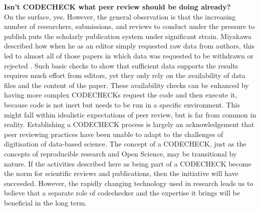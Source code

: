 \documentclass[12pt]{article}
\begin{document}
\textbf{Isn't CODECHECK what peer review should be doing already?} \\
On the surface, yes.
However, the general observation is that the
increasing number of researchers, submissions, and reviews to conduct
under the pressure to publish puts the scholarly publication system
under significant strain.
Miyakawa described how when he as an editor simply requested raw data from authors, this led to almost all of those papers in which data was requested to be withdrawn or rejected \cite{miyakawa_no_2020}.
Such basic checks to show that
sufficient data supports the results requires much effort from editors,
yet they only rely on the availability of data files and the content of the
paper.
These availability checks can be enhanced by having more complex CODECHECKs request the code and then execute it, because code is not inert but needs to be run in a specific environment.
This might fall within idealistic expectations of peer review,
but is far from common in reality.
Establishing a CODECHECK
process is largely an acknowledgement that peer reviewing practices
have been unable to adapt to the challenges of digitisation of data-based science.
The concept of a CODECHECK,
just as the concepts of reproducible research and Open Science,
may be transitional by nature. If the activities described here as
being part of a CODECHECK become the norm for scientific reviews and
publications, then the initiative will have succeeded. However, the
rapidly changing technology used in research leads us to believe that
a separate role of codechecker and the expertise it brings will be
beneficial in the long term.

\newpage
\end{document}
